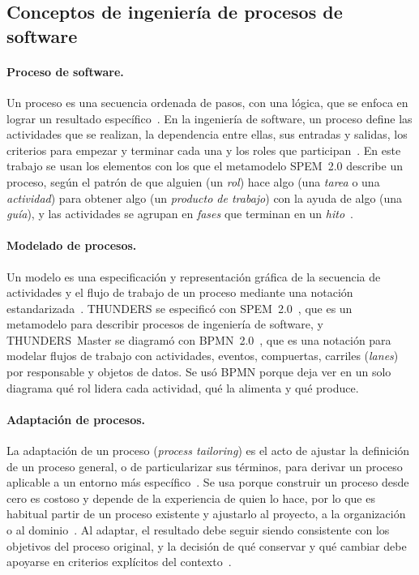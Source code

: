 \documentclass[12pt,letterpaper,oneside]{report}
\begin{document}
\subsection{Conceptos de ingeniería de procesos de software}

\paragraph{Proceso de software.}
Un proceso es una secuencia ordenada de pasos, con una lógica, que se enfoca en
lograr un resultado específico~\cite{humphrey1989}. En la ingeniería de
software, un proceso define las actividades que se realizan, la dependencia
entre ellas, sus entradas y salidas, los criterios para empezar y terminar cada
una y los roles que participan~\cite{agredo2022thesis}. En este trabajo se usan
los elementos con los que el metamodelo SPEM~2.0 describe un proceso, según el
patrón de que alguien (un \emph{rol}) hace algo (una \emph{tarea} o una
\emph{actividad}) para obtener algo (un \emph{producto de trabajo}) con la ayuda
de algo (una \emph{guía}), y las actividades se agrupan en \emph{fases} que
terminan en un \emph{hito}~\cite{omg2008spem}.

\paragraph{Modelado de procesos.}
Un modelo es una especificación y representación gráfica de la secuencia de actividades 
y el flujo de trabajo de un proceso mediante una notación estandarizada~\cite{omg2011bpmn}. 
THUNDERS se especificó con SPEM~2.0~\cite{omg2008spem}, que
es un metamodelo para describir procesos de ingeniería de software, y
THUNDERS~Master se diagramó con BPMN~2.0~\cite{omg2011bpmn}, que es una
notación para modelar flujos de trabajo con actividades, eventos, compuertas,
carriles (\textit{lanes}) por responsable y objetos de datos. Se usó BPMN
porque deja ver en un solo diagrama qué rol lidera cada actividad, qué la
alimenta y qué produce.

\paragraph{Adaptación de procesos.}
La adaptación de un proceso (\textit{process tailoring}) es el acto de ajustar la
definición de un proceso general, o de particularizar sus términos, para derivar
un proceso aplicable a un entorno más específico~\cite{ginsberg1995}. Se usa
porque construir un proceso desde cero es costoso y depende de la experiencia de
quien lo hace, por lo que es habitual partir de un proceso existente y
ajustarlo al proyecto, a la organización o al dominio~\cite{xu2007}. Al adaptar, 
el resultado debe seguir siendo consistente con los objetivos del
proceso original, y la decisión de qué conservar y qué cambiar debe apoyarse en
criterios explícitos del contexto~\cite{kalus2013tailoring}.
\end{document}
